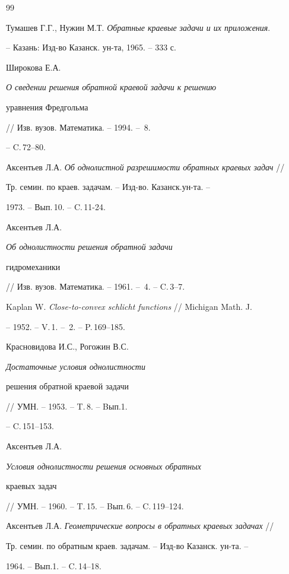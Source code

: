 \begin{thebibliography}{99}







Тумашев Г.Г., Нужин М.Т. {\em Обратные краевые задачи и их приложения}.


-- Казань: Изд-во Казанск. ун-та, 1965. -- 333 с.




Широкова Е.А. {\em О сведении решения обратной краевой задачи к решению


уравнения Фредгольма} // Изв. вузов. Математика. -- 1994. -- \No\,8.


-- C.\,72--80.




Аксентьев Л.А. {\em Об однолистной разрешимости обратных краевых задач} //


Тр. семин. по краев. задачам. -- Изд-во. Казанск.ун-та. --


1973. -- Вып.\,10. -- C.\,11-24.




Аксентьев Л.А. {\em Об однолистности решения обратной задачи


гидромеханики} // Изв. вузов. Математика. -- 1961. -- \No\,4. -- C.\,3--7.




Kaplan W. {\em Close-to-convex schlicht functions} // Michigan Math. J.


-- 1952. -- V.\,1. -- \No\,2. -- P.\,169--185.




Красновидова И.С., Рогожин В.С. {\em Достаточные условия однолистности


решения обратной краевой задачи} // УМН. -- 1953. -- T.\,8. -- Bып.1.


-- C.\,151--153.




Аксентьев Л.А. {\em Условия однолистности решения основных обратных


краевых задач} // УМН. -- 1960. -- T.\,15. -- Bып.\,6. -- C.\,119--124.




Аксентьев Л.А. {\em Геометрические вопросы в обратных краевых задачах} //


Тр. семин. по обратным краев. задачам. -- Изд-во Казанск. ун-та. --


1964. -- Вып.1. -- C.\,14--18.



\end{thebibliography}

